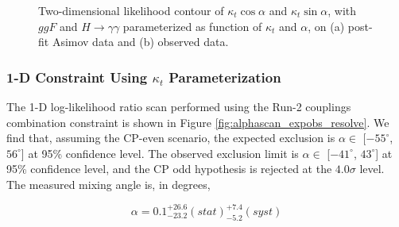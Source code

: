 \begin{figure}[htbp]
  \centering
  \caption{Two-dimensional likelihood contour of $\kappa_t \cos\alpha$ and $\kappa_t \sin\alpha$, with $ggF$ and $H \rightarrow \gamma\gamma$ parameterized as function of $\kappa_t$ and $\alpha$, on (a) post-fit Asimov data and (b) observed data.
  \label{fig:s3:contours}}
\end{figure}

\subsubsection{1-D Constraint Using $\kappa_{t}$ Parameterization}

The 1-D log-likelihood ratio scan performed using the Run-2 couplings combination constraint is shown in Figure \ref{fig:alphascan_expobs_resolve}. We find that, assuming the CP-even scenario, the expected exclusion is $\alpha \in$ [$-55^{\circ}$, $56^{\circ}$] at 95\% confidence level. The observed exclusion limit is  $\alpha \in$ [$-41^{\circ}$, $43^{\circ}$] at 95\% confidence level, and the CP odd hypothesis is rejected at the $4.0\sigma$ level. The measured mixing angle is, in degrees, 

\begin{equation}
\alpha = 0.1^{+26.6}_{-23.2}(stat)^{+7.4}_{-5.2}(syst)
\end{equation}


